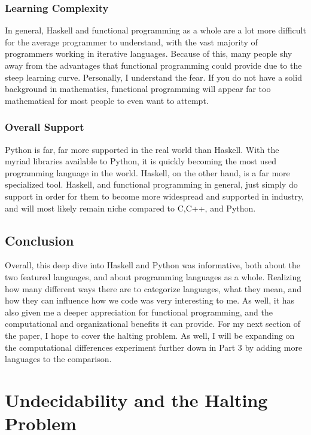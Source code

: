 \documentclass{article}
\begin{document}
        \subsubsection{Learning Complexity}
        In general, Haskell and functional programming as a whole are a lot more difficult for the average programmer to understand, with the vast majority of programmers working in iterative languages. Because of this, many people shy away from the advantages that functional programming could provide due to the steep learning curve. Personally, I understand the fear. If you do not have a solid background in mathematics, functional programming will appear far too mathematical for most people to even want to attempt. 
        \subsubsection{Overall Support}
        Python is far, far more supported in the real world than Haskell. With the myriad libraries available to Python, it is quickly becoming the most used programming language in the world. Haskell, on the other hand, is a far more specialized tool. Haskell, and functional programming in general, just simply do support in order for them to become more widespread and supported in industry, and will most likely remain niche compared to C,C++, and Python. 
        
\subsection {Conclusion} 
Overall, this deep dive into Haskell and Python was informative, both about the two featured languages, and about programming languages as a whole. Realizing how many different ways there are to categorize languages, what they mean, and how they can influence how we code was very interesting to me. As well, it has also given me a deeper appreciation for functional programming, and the computational and organizational benefits it can provide. For my next section of the paper, I hope to cover the halting problem. As well, I will be expanding on the computational differences experiment further down in Part 3 by adding more languages to the comparison.

\medskip\noindent 
\medskip\noindent

\section{Undecidability and the Halting Problem}
\end{document}
